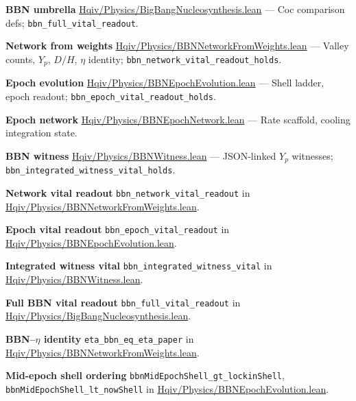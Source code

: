 \documentclass[11pt]{amsart}
\newcommand{\leanrepo}{https://github.com/HQIV/hqiv-lean/blob/main}
\newcommand{\leanfile}[1]{\href{\leanrepo/#1}{\footnotesize\url{#1}}}
\newcommand{\leanid}[1]{\nolinkurl{#1}}
\begin{document}
\begin{description}[leftmargin=2.5em,style=nextline]
\footnotesize\sloppy
\item {}\label{lean:bbn-umbrella}\textbf{BBN umbrella}
  \leanfile{Hqiv/Physics/BigBangNucleosynthesis.lean} ---
  Coc comparison defs; \leanid{bbn\_full\_vital\_readout}.
\item {}\label{lean:bbn-network}\textbf{Network from weights}
  \leanfile{Hqiv/Physics/BBNNetworkFromWeights.lean} ---
  Valley counts, $Y_p$, $D/H$, $\eta$ identity;
  \leanid{bbn\_network\_vital\_readout\_holds}.
\item {}\label{lean:bbn-epoch-evolution}\textbf{Epoch evolution}
  \leanfile{Hqiv/Physics/BBNEpochEvolution.lean} ---
  Shell ladder, epoch readout;
  \leanid{bbn\_epoch\_vital\_readout\_holds}.
\item {}\label{lean:bbn-epoch-network}\textbf{Epoch network}
  \leanfile{Hqiv/Physics/BBNEpochNetwork.lean} ---
  Rate scaffold, cooling integration state.
\item {}\label{lean:bbn-witness}\textbf{BBN witness}
  \leanfile{Hqiv/Physics/BBNWitness.lean} ---
  JSON-linked $Y_p$ witnesses;
  \leanid{bbn\_integrated\_witness\_vital\_holds}.
\item {}\label{lean:bbn-network-vital}\textbf{Network vital readout}
  \leanid{bbn\_network\_vital\_readout} in
  \leanfile{Hqiv/Physics/BBNNetworkFromWeights.lean}.
\item {}\label{lean:bbn-epoch-vital}\textbf{Epoch vital readout}
  \leanid{bbn\_epoch\_vital\_readout} in
  \leanfile{Hqiv/Physics/BBNEpochEvolution.lean}.
\item {}\label{lean:bbn-integrated-vital}\textbf{Integrated witness vital}
  \leanid{bbn\_integrated\_witness\_vital} in
  \leanfile{Hqiv/Physics/BBNWitness.lean}.
\item {}\label{lean:bbn-full-vital}\textbf{Full BBN vital readout}
  \leanid{bbn\_full\_vital\_readout} in
  \leanfile{Hqiv/Physics/BigBangNucleosynthesis.lean}.
\item {}\label{lean:eta-bbn-eq}\textbf{BBN--$\eta$ identity}
  \leanid{eta\_bbn\_eq\_eta\_paper} in
  \leanfile{Hqiv/Physics/BBNNetworkFromWeights.lean}.
\item {}\label{lean:bbn-mid-shell-order}\textbf{Mid-epoch shell ordering}
  \leanid{bbnMidEpochShell\_gt\_lockinShell},
  \leanid{bbnMidEpochShell\_lt\_nowShell} in
  \leanfile{Hqiv/Physics/BBNEpochEvolution.lean}.

\end{description}
\end{document}
